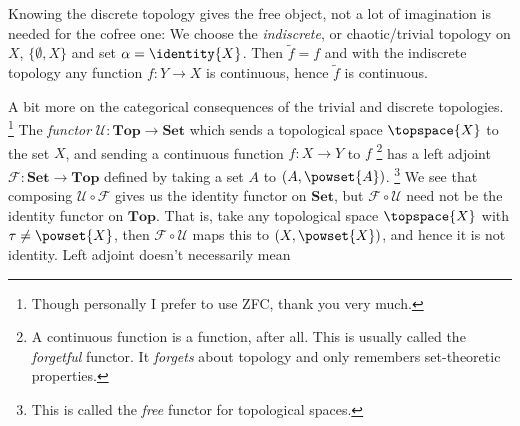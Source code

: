         \par\hfill\par
        \begin{minipage}[b]{0.56\textwidth}
            Knowing the discrete topology gives the free object, not a
            lot of imagination is needed for the cofree one: We choose
            the \textit{indiscrete}, or chaotic/trivial topology on $X$,
            $\{\emptyset,X\}$ and set $\alpha=\identity{X}$. Then
            $\tilde{f}=f$ and with the indiscrete topology any function
            $f:Y\rightarrow{X}$ is continuous, hence $\tilde{f}$ is
            continuous.
        \end{minipage}
        \hfill
        \par\vspace{2.5ex}
        A bit more on the categorical consequences of the trivial and
        discrete topologies.%
        \footnote{%
            Though personally I prefer to use ZFC, thank you very much.%
        }
        The \textit{functor} $\mathscr{U}:\mathbf{Top}\rightarrow\mathbf{Set}$
        which sends a topological space $\topspace{X}$ to the set $X$,
        and sending a continuous function $f:X\rightarrow{Y}$ to $f$%
        \footnote{%
            A continuous function is a function, after all. This is
            usually called the \textit{forgetful} functor. It
            \textit{forgets} about topology and only remembers
            set-theoretic properties.%
        }
        has a left adjoint $\mathscr{F}:\mathbf{Set}\rightarrow\mathbf{Top}$
        defined by taking a set $A$ to $(A,\powset{A})$.%
        \footnote{%
            This is called the \textit{free} functor for topological
            spaces.
        }
        We see that composing $\mathscr{U}\circ\mathscr{F}$ gives us
        the identity functor on $\mathbf{Set}$, but
        $\mathscr{F}\circ\mathscr{U}$ need not be the identity functor
        on $\mathbf{Top}$. That is, take any topological space
        $\topspace{X}$ with $\tau\ne\powset{X}$, then
        $\mathscr{F}\circ\mathscr{U}$ maps this to $(X,\powset{X})$, and
        hence it is not identity. Left adjoint doesn't necessarily mean
